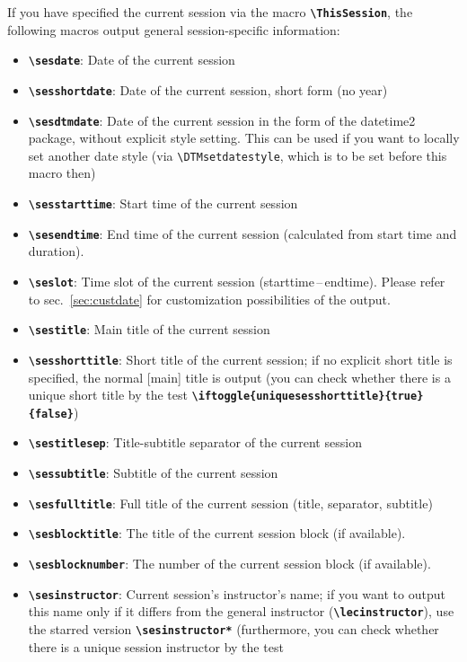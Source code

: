 \documentclass[english]{article}
\newcommand*\jmacro[1]{\textbf{\texttt{#1}}}
\newcommand*\jcsmacro[1]{\jmacro{\textbackslash{#1}}}
\newcommand*\jfmacro[1]{\texttt{#1}}
\newcommand*\jfcsmacro[1]{\jfmacro{\textbackslash{#1}}}
\newcommand*\jparam[1]{\angus #1\angud}
\begin{document}
If you have specified the current session via the macro \jcsmacro{ThisSession},
the following macros output general session-specific information:
\begin{itemize}
\item \jcsmacro{sesdate}: Date of the current session
\item \jcsmacro{sesshortdate}: Date of the current session,
short form (no year)
\item \jcsmacro{sesdtmdate}: Date of the current session in the form of the
       \textsf{datetime2} package, without explicit style setting.
       This can be used if you want to locally set another
       date style (via \jfcsmacro{DTMsetdatestyle}, which is to be set before this macro then)
\item \jcsmacro{sesstarttime}: Start time of the current session
\item \jcsmacro{sesendtime}: End time of the current session (calculated from start time and duration).
\item \jcsmacro{seslot}: Time slot of the current session (starttime\,--\,endtime). Please refer to
sec.~\ref{sec:custdate} for customization possibilities of the output.
\item \jcsmacro{sestitle}: Main title of the current session
\item \jcsmacro{sesshorttitle}: Short title of the current session; if
no explicit short title is specified, the normal [main] title is output
(you can check whether there is a unique short title by the test
\jcsmacro{iftoggle\{uniquesesshorttitle\}\{\jparam{true}\}\{\jparam{false}\}})
\item \jcsmacro{sestitlesep}: Title-subtitle separator of
the current session
\item \jcsmacro{sessubtitle}: Subtitle of the current session
\item \jcsmacro{sesfulltitle}: Full title of the current
session (title, separator, subtitle)
\item \jcsmacro{sesblocktitle}: The title of the current session block (if available).
\item \jcsmacro{sesblocknumber}: The number of the current session block (if available).
\item \jcsmacro{sesinstructor}: Current session's instructor's name; if you want to output this name only if it differs from the general instructor (\jcsmacro{lecinstructor}), use the starred version \jcsmacro{sesinstructor*} (furthermore, you can check whether
there is a unique session instructor by the test

\end{itemize}
\end{document}

